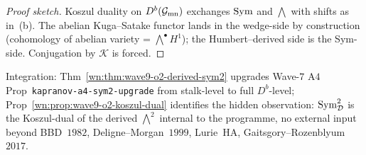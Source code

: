 \begin{proof}[Proof sketch]
Koszul duality on $D^b(\mathcal{G}_{\mathrm{mn}})$ exchanges
$\mathrm{Sym}$ and $\bigwedge$ with shifts as in~(b). The abelian
Kuga--Satake functor lands in the wedge-side by construction
(cohomology of abelian variety = $\bigwedge^\bullet H^1$);
the Humbert--derived side is the Sym-side. Conjugation by
$\mathcal{K}$ is forced.
\end{proof}

Integration: Thm~\ref{wn:thm:wave9-o2-derived-sym2} upgrades
Wave-$7$ A$4$ Prop~\texttt{kapranov-a4-sym2-upgrade} from
stalk-level to full $D^b$-level; Prop~\ref{wn:prop:wave9-o2-koszul-dual}
identifies the hidden observation: $\mathrm{Sym}^2_{\mathcal{D}}$ is the Koszul-dual of
the derived $\bigwedge^2$ internal to the programme, no external
input beyond BBD~$1982$, Deligne--Morgan~$1999$, Lurie~HA,
Gaitsgory--Rozenblyum~$2017$.
